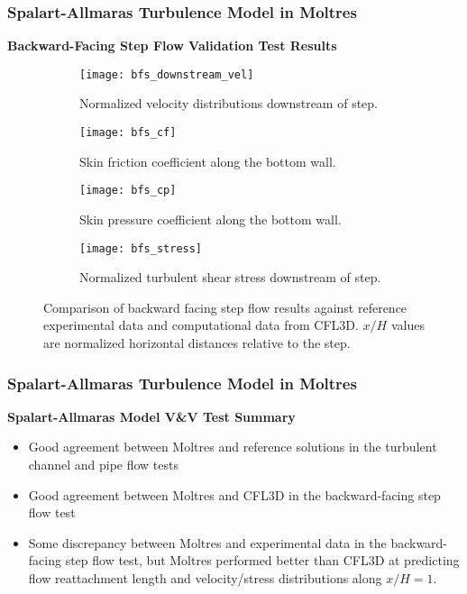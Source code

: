 \begin{frame}
  \frametitle{Spalart-Allmaras Turbulence Model in Moltres}
  \textbf{Backward-Facing Step Flow Validation Test Results}
  \begin{figure}[htb]
    \centering
    \hfill
    \begin{subfigure}[b]{0.24\columnwidth}
      \centering
      \texttt{[image: bfs\_downstream\_vel]}
      \caption{Normalized velocity distributions downstream of step.}
      \label{fig:bfs-downstream}
    \end{subfigure} %
    \hfill
    \begin{subfigure}[b]{0.24\columnwidth}
      \centering
      \texttt{[image: bfs\_cf]}
      \caption{Skin friction coefficient along the bottom wall.}
      \label{fig:bfs-cf}
    \end{subfigure}
    \hfill
    \begin{subfigure}[b]{0.24\columnwidth}
      \centering
      \texttt{[image: bfs\_cp]}
      \caption{Skin pressure coefficient along the bottom wall.}
      \label{fig:bfs-cp}
    \end{subfigure}%
    \begin{subfigure}[b]{0.24\columnwidth}
      \centering
      \texttt{[image: bfs\_stress]}
      \caption{Normalized turbulent shear stress downstream
      of step.}
      \label{fig:bfs-stress}
    \end{subfigure}
    \caption{Comparison of backward facing step flow results against reference
    experimental data and computational data from CFL3D. $x/H$ values are normalized horizontal
    distances relative to the step.}
    \label{fig:bfs-plots}
  \end{figure}
\end{frame}

\begin{frame}
  \frametitle{Spalart-Allmaras Turbulence Model in Moltres}
  \textbf{Spalart-Allmaras Model V\&V Test Summary}
  \begin{itemize}
    \item Good agreement between Moltres and reference solutions in the turbulent channel and pipe
      flow tests
    \item Good agreement between Moltres and CFL3D in the backward-facing step flow test
    \item Some discrepancy between Moltres and experimental data in the backward-facing step flow
      test, but Moltres performed better than CFL3D at predicting flow reattachment length and
      velocity/stress distributions along $x/H=1$.
  \end{itemize}
\end{frame}
